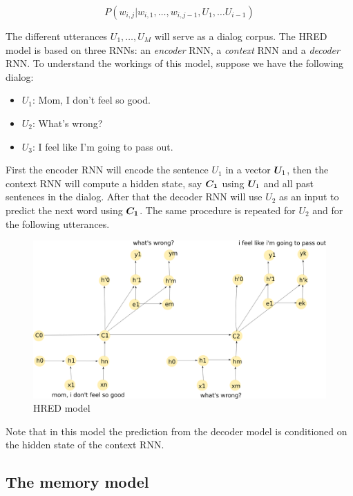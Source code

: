 \begin{equation}
P(w_{i,j} | w_{i,1}, \dots , w_{i,j-1}, U_{1}, \dots U_{i-1})
\end{equation}

The different utterances $ U_1 , \dots, U_M $ will serve as a dialog corpus.
The HRED model is based on three RNNs: an \textit{encoder} RNN, a \textit{context} RNN and a \textit{decoder} RNN.  To understand the workings of this model, suppose we have the following dialog:
\begin{itemize}
\item $U_1$: Mom, I don't feel so good.\\
\item $U_2$: What's wrong?\\
\item $U_3$: I feel like I'm going to pass out.
\end{itemize}

First the encoder RNN will encode the sentence $U_1$ in a vector $\bm{U}_1$, then the context RNN will compute a hidden state, say $\bm{C_1}$ using $\bm{U}_1$ and all past sentences in the dialog. After that the decoder RNN will use $U_2$ as an input to predict the next word using $\bm{C_1}$. The same procedure is repeated for $U_2$ and for the following utterances.

\begin{figure}[h]
\label{HRED}
\includegraphics[width=12cm]{img/HRED_placeholder.png}
\caption{HRED model}
\end{figure}

Note that in this model the prediction from the decoder model is conditioned on the hidden state of the context RNN.

\subsection{The memory model} 

